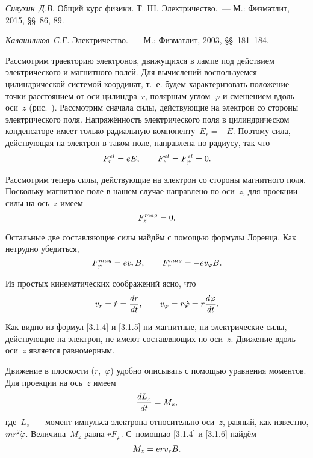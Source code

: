\begin{lab:literature}
\item{ \emph {Сивухин~Д.В.} Общий курс физики. Т. III. Электричество.~--- М.:
Физматлит, 2015, \S\S~86, 89.}
\item{ \emph {Калашников~С.Г.} Электричество.~--- М.: Физматлит, 2003,
\S\S~181--184.}
\end{lab:literature}





Рассмотрим траекторию электронов, движущихся в лампе под действием
электрического и магнитного полей. Для вычислений воспользуемся цилиндрической
системой координат, т.~е. будем характеризовать положение точки расстоянием от
оси цилиндра~$r$, полярным углом~$\varphi$ и смещением вдоль оси~$z$
(рис.~). Рассмотрим сначала силы, действующие на
электрон со стороны электрического поля. Напряжённость электрического поля в
цилиндрическом конденсаторе имеет только радиальную компоненту~$E_r=-E$. Поэтому
сила, действующая на электрон в таком поле, направлена по радиусу, так что
\begin{equation}
	F_r^{el}=eE,\qquad F_z^{el}=F_{\varphi}^{el}=0.
	\eqmark{3.1.4}
\end{equation}

Рассмотрим теперь силы, действующие на электрон со стороны магнитного поля.
Поскольку магнитное поле в нашем случае
направлено по оси~$z$, для проекции силы на ось~$z$ имеем
\begin{equation}
	F_z^{mag}=0.
	\eqmark{3.1.5}
\end{equation}

Остальные две составляющие силы найдём с помощью формулы Лоренца. Как нетрудно
убедиться,
\begin{equation}
	F_{\varphi}^{mag}=ev_rB,\qquad F_{r}^{mag}=-ev_{\varphi}B.
	\eqmark{3.1.6}
\end{equation}

Из простых кинематических соображений ясно, что
\begin{equation}
	v_r=\dot{r}=\frac{dr}{dt},\qquad
v_{\varphi}=r\dot{\varphi}=r\frac{d\varphi}{dt}.
	\eqmark{3.1.7}
\end{equation}

Как видно из формул \eqref{3.1.4} и \eqref{3.1.5} ни магнитные, ни электрические
силы, действующие на электрон, не имеют составляющих по оси~$z$. Движение вдоль
оси~$z$ является равномерным.

Движение в плоскости ($r$,~$\varphi$) удобно описывать с помощью уравнения
моментов. Для проекции на ось~$z$ имеем
\begin{equation}
	\frac{dL_{z}}{dt}=M_z,
	\eqmark{3.1.8}
\end{equation}
где~$L_{z}$~--- момент импульса электрона относительно оси~$z$, равный, как
известно, $mr^2\dot{\varphi}$. Величина~$M_z$ равна $rF_{\varphi}$. С~помощью
\eqref{3.1.4} и \eqref{3.1.6} найдём
\begin{equation}
	M_z=erv_rB.
	\eqmark{3.1.9}
\end{equation}

